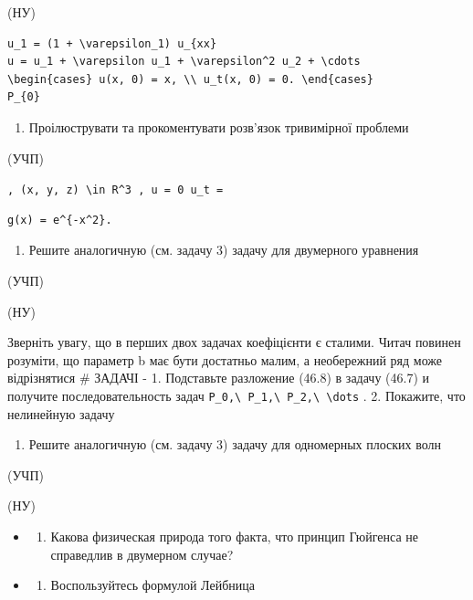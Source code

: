 \documentclass[
  ukrainian,
]{article}
\providecommand{\tightlist}{%
  \setlength{\itemsep}{0pt}\setlength{\parskip}{0pt}}
\begin{document}
(НУ)

\begin{verbatim}
u_1 = (1 + \varepsilon_1) u_{xx}
u = u_1 + \varepsilon u_1 + \varepsilon^2 u_2 + \cdots
\begin{cases} u(x, 0) = x, \\ u_t(x, 0) = 0. \end{cases}
P_{0}
\end{verbatim}

\begin{enumerate}
\def\labelenumi{\arabic{enumi}.}
\setcounter{enumi}{2}
\tightlist
\item
  Проілюструвати та прокоментувати розв'язок тривимірної проблеми
\end{enumerate}

(УЧП)

\texttt{,\ \textquotesingle{}(x,\ y,\ z)\ \textbackslash{}in\ R\^{}3\textquotesingle{}\ ,\ \textquotesingle{}u\ =\ 0\textquotesingle{}\ u\_t\ =}

\begin{verbatim}
g(x) = e^{-x^2}.
\end{verbatim}

\begin{enumerate}
\def\labelenumi{\arabic{enumi}.}
\setcounter{enumi}{3}
\tightlist
\item
  Решите аналогичную (см. задачу 3) задачу для двумерного уравнения
\end{enumerate}

(УЧП)

(НУ)

Зверніть увагу, що в перших двох задачах коефіцієнти є сталими. Читач
повинен розуміти, що параметр b має бути достатньо малим, а необережний
ряд може відрізнятися \# ЗАДАЧІ - 1. Подставьте разложение (46.8) в
задачу (46.7) и получите последовательность задач
\texttt{P\_0,\textbackslash{}\ P\_1,\textbackslash{}\ P\_2,\textbackslash{}\ \textbackslash{}dots}
. 2. Покажите, что нелинейную задачу

\begin{enumerate}
\def\labelenumi{\arabic{enumi}.}
\setcounter{enumi}{4}
\tightlist
\item
  Решите аналогичную (см. задачу 3) задачу для одномерных плоских волн
\end{enumerate}

(УЧП)

(НУ)

\begin{itemize}
\tightlist
\item
  \begin{enumerate}
  \def\labelenumi{\arabic{enumi}.}
  \setcounter{enumi}{5}
  \tightlist
  \item
    Какова физическая природа того факта, что принцип Гюйгенса не
    справедлив в двумерном случае?
  \end{enumerate}
\item
  \begin{enumerate}
  \def\labelenumi{\arabic{enumi}.}
  \setcounter{enumi}{6}
  \tightlist
  \item
    Воспользуйтесь формулой Лейбница
  \end{enumerate}
\end{itemize}
\end{document}
